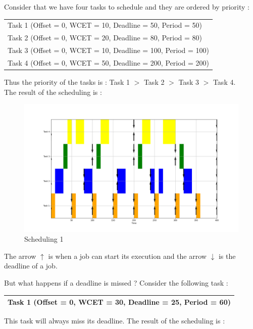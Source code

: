 \documentclass[a4paper,12pt]{article}
\begin{document}
Consider that we have four tasks to schedule and they are ordered by priority : \\

\smallskip
\begin{center}
\begin{tabular}{| l |}
\hline
Task 1 (Offset = 0, WCET = 10, Deadline = 50, Period = 50)\\
Task 2 (Offset = 0, WCET = 20, Deadline = 80, Period = 80)\\
Task 3 (Offset = 0, WCET = 10, Deadline = 100, Period = 100)\\
Task 4 (Offset = 0, WCET = 50, Deadline = 200, Period = 200)\\
\hline
\end{tabular}
\end{center}

\smallskip
\noindent
Thus the priority of the tasks is : Task 1 $>$ Task 2 $>$ Task 3 $>$ Task 4. \\

\noindent
The result of the scheduling is : \\

\begin{figure}[h!]
  \centering
  \includegraphics[width=1\textwidth]{Resources_tex/Pictures/Figure_1.png}
  \caption{Scheduling 1}
  \label{fig: Scheduling 1}
\end{figure}
\noindent
The arrow $\uparrow$ is when a job can start its execution and the arrow $\downarrow$ is the deadline of a job. 

\newpage 
\noindent
But what happens if a deadline is missed ? Consider the following task : \\
\begin{center}
\begin{tabular}{| l |}
\hline
Task 1 (Offset = 0, WCET = 30, Deadline = 25, Period = 60)\\
\hline
\end{tabular}
\end{center}
This task will always miss its deadline. The result of the scheduling is :\\
\end{document}
